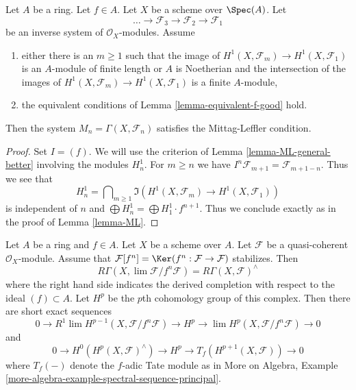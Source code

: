 \begin{lemma}
\label{lemma-ML-better}
Let $A$ be a ring. Let $f \in A$. Let $X$ be a scheme over $\Spec(A)$. Let
$$
\ldots \to \mathcal{F}_3 \to \mathcal{F}_2 \to \mathcal{F}_1
$$
be an inverse system of $\mathcal{O}_X$-modules. Assume
\begin{enumerate}
\item either there is an $m \geq 1$ such that the image of
$H^1(X, \mathcal{F}_m) \to H^1(X, \mathcal{F}_1)$
is an $A$-module of finite length or $A$ is Noetherian
and the intersection of the images of
$H^1(X, \mathcal{F}_m) \to H^1(X, \mathcal{F}_1)$
is a finite $A$-module,
\item the equivalent conditions of Lemma \ref{lemma-equivalent-f-good} hold.
\end{enumerate}
Then the system $M_n = \Gamma(X, \mathcal{F}_n)$ satisfies the
Mittag-Leffler condition.
\end{lemma}

\begin{proof}
Set $I = (f)$. We will use the criterion of Lemma \ref{lemma-ML-general-better}
involving the modules $H^1_n$. For $m \geq n$ we have
$I^n\mathcal{F}_{m + 1} = \mathcal{F}_{m + 1 - n}$. Thus we see that
$$
H^1_n = \bigcap\nolimits_{m \geq 1} \Im\left(
H^1(X, \mathcal{F}_m) \to H^1(X, \mathcal{F}_1)
\right)
$$
is independent of $n$ and
$\bigoplus H^1_n = \bigoplus H^1_1 \cdot f^{n + 1}$.
Thus we conclude exactly as in the proof of Lemma \ref{lemma-ML}.
\end{proof}

\begin{lemma}
\label{lemma-formal-functions-principal}
\begin{reference}
\cite[Lemma 1.6]{Bhatt-local}
\end{reference}
Let $A$ be a ring and $f \in A$. Let $X$ be a scheme over $A$.
Let $\mathcal{F}$ be a quasi-coherent $\mathcal{O}_X$-module.
Assume that $\mathcal{F}[f^n] = \Ker(f^n : \mathcal{F} \to \mathcal{F})$
stabilizes. Then
$$
R\Gamma(X, \lim \mathcal{F}/f^n\mathcal{F}) =
R\Gamma(X, \mathcal{F})^\wedge
$$
where the right hand side indicates the derived completion
with respect to the ideal $(f) \subset A$. Let $H^p$ be the
$p$th cohomology group of this complex. Then there are short
exact sequences
$$
0 \to R^1\lim H^{p - 1}(X, \mathcal{F}/f^n\mathcal{F})
\to H^p \to \lim H^p(X, \mathcal{F}/f^n\mathcal{F}) \to 0
$$
and
$$
0 \to H^0(H^p(X, \mathcal{F})^\wedge) \to H^p \to
T_f(H^{p + 1}(X, \mathcal{F})) \to 0
$$
where $T_f(-)$ denote the $f$-adic Tate module as in
More on Algebra, Example
\ref{more-algebra-example-spectral-sequence-principal}.
\end{lemma}

